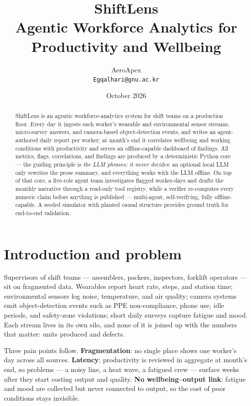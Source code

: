 \documentclass[11pt,a4paper]{article}
\title{\textcolor{slblue}{\textbf{ShiftLens}}\\[2pt]
\large Agentic Workforce Analytics for Productivity and Wellbeing}
\author{AeroApex\\[1pt] \normalsize\texttt{Egqalhari@gnu.ac.kr}}
\date{October 2026}
\begin{document}
\maketitle

\begin{abstract}
\noindent
ShiftLens is an agentic workforce-analytics system for shift teams on a
production floor. Every day it ingests each worker's wearable and
environmental sensor streams, micro-survey answers, and camera-based
object-detection events, and writes an agent-authored daily report per
worker; at month's end it correlates wellbeing and working conditions with
productivity and serves an offline-capable dashboard of findings. All
metrics, flags, correlations, and findings are produced by a deterministic
Python core --- the guiding principle is \emph{the LLM phrases; it never
decides}: an optional local LLM only rewrites the prose summary, and
everything works with the LLM offline. On top of that core, a five-role agent team
investigates flagged worker-days and drafts the monthly narrative through
a read-only tool registry, while a verifier re-computes every numeric
claim before anything is published --- multi-agent, self-verifying, fully
offline-capable. A seeded simulator with
planted causal structure provides ground truth for end-to-end validation.
\end{abstract}

\section{Introduction and problem}
Supervisors of shift teams --- assemblers, packers, inspectors, forklift
operators --- sit on fragmented data. Wearables report heart rate, steps,
and station time; environmental sensors log noise, temperature, and air
quality; camera systems emit object-detection events such as PPE
non-compliance, phone use, idle periods, and safety-zone violations; short
daily surveys capture fatigue and mood. Each stream lives in its own silo,
and none of it is joined up with the numbers that matter: units produced
and defects.

Three pain points follow. \textbf{Fragmentation}: no single place shows one
worker's day across all sources. \textbf{Latency}: productivity is reviewed
in aggregate at month's end, so problems --- a noisy line, a heat wave, a
fatigued crew --- surface weeks after they start costing output and
quality. \textbf{No wellbeing--output link}: fatigue and mood are collected
but never connected to output, so the cost of poor conditions stays
invisible.
\end{document}
